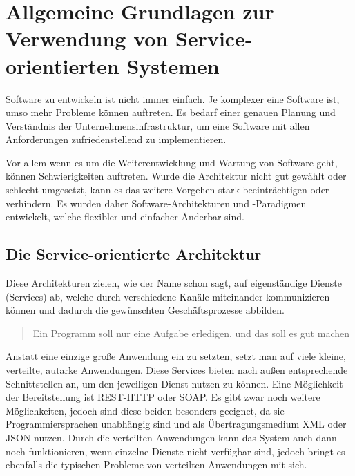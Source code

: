 \chapter[Grundlagen]{Allgemeine Grundlagen zur Verwendung von Service-orientierten Systemen}
\label{chap:grundlagen}
Software zu entwickeln ist nicht immer einfach. Je komplexer eine Software ist, umso mehr Probleme können auftreten. Es bedarf einer genauen Planung und Verständnis der Unternehmensinfrastruktur, um eine Software mit allen Anforderungen zufriedenstellend zu implementieren. 

Vor allem wenn es um die Weiterentwicklung und Wartung von Software geht, können Schwierigkeiten auftreten. Wurde die Architektur nicht gut gewählt oder schlecht umgesetzt, kann es das weitere Vorgehen stark beeinträchtigen oder verhindern. Es wurden daher Software-Architekturen und -Paradigmen entwickelt, welche flexibler und einfacher Änderbar sind.

\section{Die Service-orientierte Architektur}
\label{sec:architektur}
Diese Architekturen zielen, wie der Name schon sagt, auf eigenständige Dienste (Services) ab, welche durch verschiedene Kanäle miteinander kommunizieren können und dadurch die gewünschten Geschäftsprozesse abbilden. 
\begin{quotation}
    \frqq Ein Programm soll nur eine Aufgabe erledigen, und das soll es gut machen\flqq \cite[S. 2]{EWolff2015:ContinuouosDelivery}
\end{quotation}
Anstatt eine einzige große Anwendung ein zu setzten, setzt man auf viele kleine, verteilte, autarke Anwendungen. Diese Services bieten nach außen entsprechende Schnittstellen an, um den jeweiligen Dienst nutzen zu können. Eine Möglichkeit der Bereitstellung ist REST-HTTP oder SOAP. Es gibt zwar noch weitere Möglichkeiten, jedoch sind diese beiden besonders geeignet, da sie Programmiersprachen unabhängig sind und als Übertragungsmedium XML oder JSON nutzen.
Durch die verteilten Anwendungen kann das System auch dann noch funktionieren, wenn einzelne Dienste nicht verfügbar sind, jedoch bringt es ebenfalls die typischen Probleme von verteilten Anwendungen mit sich.

